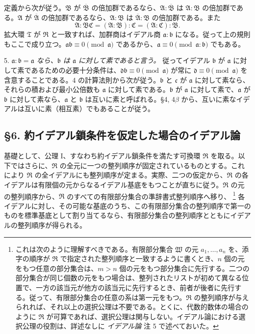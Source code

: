 \documentclass[11pt]{article}
\providecommand{\mR}{\mathfrak{R}}
\providecommand{\mT}{\mathfrak{T}}
\providecommand{\mA}{\mathfrak{A}}
\providecommand{\mB}{\mathfrak{B}}
\providecommand{\mC}{\mathfrak{C}}
\providecommand{\ma}{\mathfrak{a}}
\providecommand{\mb}{\mathfrak{b}}
\providecommand{\mc}{\mathfrak{c}}
\providecommand{\md}{\mathfrak{d}}
\begin{document}
定義から次が従う。$\mB$ が $\overline{\mB}$ の倍加群であるなら、$\mA:\overline{\mB}$ は $\mA:\mB$ の倍加群である。$\mA$ が $\overline{\mA}$ の倍加群であるなら、$\mA:\mB$ は $\overline{\mA}:\mB$ の倍加群である。また
\[
        \mA:\mB\mC=(\mA:\mB):\mC=(\mA:\mC):\mB .
\]
拡大環 $\mT$ が $\mR$ と一致すれば、加群商はイデアル商 $\ma:\mb$ になる。従って上の規則もここで成り立つ。$\ma\mb\equiv0\pmod{\ma}$ であるから、$\ma\equiv0\pmod{\ma:\mb}$ でもある。

5. \emph{$\ma:\mb=\ma$ なら、$\mb$ は $\ma$ に対して素であると言う。} 従ってイデアル $\mb$ が $\ma$ に対して素であるための必要十分条件は、$\md\mb\equiv0\pmod{\ma}$ が常に $\md\equiv0\pmod{\ma}$ を含意することである。4 の計算法則から次が従う。$\mb$ と $\mc$ が $\ma$ に対して素なら、それらの積および最小公倍数も $\ma$ に対して素である。$\mb$ が $\ma$ に対して素で、$\ma$ が $\mb$ に対して素なら、$\ma$ と $\mb$ は互いに素と呼ばれる。§4, 4$\beta$ から、互いに素なイデアルは互いに素（相互素）でもあることが従う。


\setcounter{footnote}{25}

\subsection*{§6. 約イデアル鎖条件を仮定した場合のイデアル論}

基礎として、公理 I、すなわち約イデアル鎖条件を満たす可換環 $\mR$ を取る。以下ではさらに、$\mR$ の全元に一つの整列順序が固定されているものとする。これにより $\mR$ の全イデアルにも整列順序が定まる。実際、二つの仮定から、$\mR$ の各イデアルは有限個の元からなるイデアル基底をもつことが直ちに従う。$\mR$ の元の整列順序から、$\mR$ のすべての有限部分集合の準辞書式整列順序へ移り、
\footnote{これは次のように理解すべきである。有限部分集合 $\mathfrak W$ の元 $a_1,\ldots,a_n$ を、添字の順序が $\mR$ で指定された整列順序と一致するように書くとき、$n$ 個の元をもつ任意の部分集合は、$m>n$ 個の元をもつ部分集合に先行する。二つの部分集合が同じ個数の元をもつ場合は、整列されたリストが初めて異なる位置で、一方の該当元が他方の該当元に先行するとき、前者が後者に先行する。従って、有限部分集合の任意の系は第一元をもつ。$\mR$ の整列順序が与えられれば、それ以上の選択公理は不要である。とくに、代数的数体の場合のように $\mR$ が可算であれば、選択公理は関与しない。イデアル論における選択公理の役割は、詳述なしに \emph{イデアル論} 注 5 で述べておいた。}
各イデアルに対し、その可能な基底のうち、この有限部分集合の整列順序で第一のものを標準基底として割り当てるなら、有限部分集合の整列順序とともにイデアルの整列順序が得られる。
\end{document}
